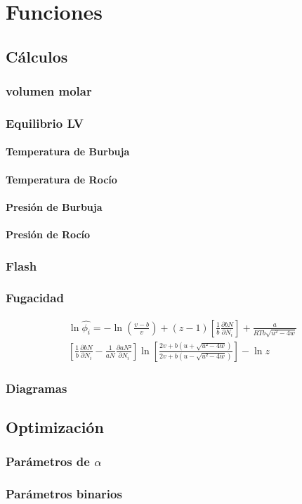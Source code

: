 \chapter{Funciones}
	\section{Cálculos}

		
		
		
		
		

		\subsection{volumen molar}
		\subsection{Equilibrio LV}
			\subsubsection{Temperatura de Burbuja}
		\subsubsection{Temperatura de Rocío}
			\subsubsection{Presión de Burbuja}
		\subsubsection{Presión de Rocío}
		\subsection{Flash}
		\subsection{Fugacidad}
\begin{multline}
\ln\hat{\phi_i} = - \ln\left(\frac{v-b}{v}\right) 
+ (z-1)\left[\frac{1}{b}\frac{\partial bN}{\partial N_i}\right]
+ \frac{a}{RTb\sqrt{u^2-4w}}
\\
\left[\frac{1}{b}\frac{\partial bN}{\partial N_i}
- \frac{1}{aN}\frac{\partial aN²}{\partial N_i}\right]
\ln\left[\frac{2v+b\left(u + \sqrt{u²-4w}\right)}{2v+b\left(u - \sqrt{u²-4w}\right)}\right]
-\ln{z}
\end{multline}
		
		\subsection{Diagramas}
	\section{Optimización}	
		\subsection{Parámetros de $\alpha$}
		\subsection{Parámetros binarios}
